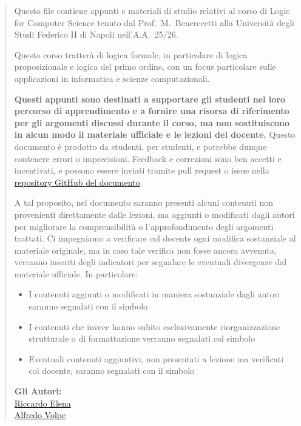 \begin{abstract}
  Questo file contiene appunti e materiali di studio relativi al corso di Logic for Computer Science tenuto dal Prof.~M.~Benerecetti alla Università degli Studi Federico II di Napoli nell'A.A.~25/26.
  
  Questo corso tratterà di logica formale, in particolare di logica proposizionale e logica del primo ordine, con un focus particolare sulle applicazioni in informatica e scienze computazionali.
  
  \textbf{Questi appunti sono destinati a supportare gli studenti nel loro percorso di apprendimento e a fornire una risorsa di riferimento per gli argomenti discussi durante il corso, ma non sostituiscono in alcun modo il materiale ufficiale e le lezioni del docente.}
  Questo documento è prodotto da studenti, per studenti, e potrebbe dunque contenere errori o imprecisioni. Feedback e correzioni sono ben accetti e incentivati, e possono essere inviati tramite pull request o issue nella \href{https://github.com/RiccardoElena/LOGIC_notes}{repository GitHub del documento}.

  A tal proposito, nel documento saranno presenti alcuni contenuti non provenienti direttamente dalle lezioni, ma aggiunti o modificati dagli autori per migliorare la comprensibilità o l'approfondimento degli argomenti trattati.
  Ci impegniamo a verificare col docente ogni modifica sostanziale al materiale originale, ma in caso tale verifica non fosse ancora avvenuta, verranno inseriti degli indicatori per segnalare le eventuali divergenze dal materiale ufficiale.
  In particolare:
  \begin{itemize}
    \item I contenuti aggiunti o modificati in maniera sostanziale dagli autori saranno segnalati con il simbolo \warningsymbol{}
    \item I contenuti che invece hanno subito esclusivamente riorganizzazione strutturale o di formattazione verranno segnalati col simbolo \infosymbol{}
    \item Eventuali contenuti aggiuntivi, non presentati a lezione ma verificati col docente, saranno segnalati con il simbolo \extrasymbol{}
  \end{itemize}
  
  \begin{flushright}
    \vspace{2cm}
    \textbf{Gli Autori:}\\
    \href{https://github.com/RiccardoElena}{Riccardo Elena}\\
    \href{https://github.com/FredFox3}{Alfredo Volpe}\\
  \end{flushright}
\end{abstract}